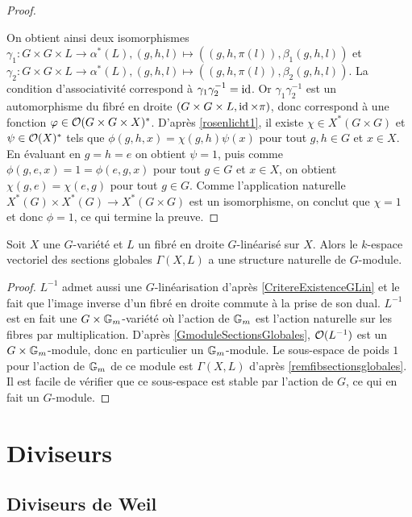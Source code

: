 \begin{proof}
\begin{center}
\begin{tikzcd}
	\end{tikzcd}
	\end{center}
	On obtient ainsi deux isomorphismes $\gamma_1:G\times G\times L\rightarrow\alpha^*(L), (g,h,l)\mapsto ((g,h,\pi(l)), \beta_1(g,h,l))$ et $\gamma_2:G\times G\times L\rightarrow\alpha^*(L), (g,h,l)\mapsto ((g,h,\pi(l)), \beta_2(g,h,l))$. La condition d'associativité correspond à $\gamma_1\gamma_2^{-1}=\id$. Or $\gamma_1\gamma_2^{-1}$ est un automorphisme du fibré en droite $(G\times G\times L,\id\times \pi)$, donc correspond à une fonction $\phi\in \Oo(G\times G\times X)^*$. D'après \ref{rosenlicht1}, il existe $\chi\in X^*(G\times G)$ et $\psi\in\Oo(X)^*$ tels que $\phi(g,h,x)=\chi(g,h)\psi(x)$ pour tout $g,h\in G$ et $x\in X$. En évaluant en $g=h=e$ on obtient $\psi=1$, puis comme $\phi(g,e,x)=1=\phi(e,g,x)$ pour tout $g\in G$ et $x\in X$, on obtient $\chi(g,e)=\chi(e,g)$ pour tout $g\in G$. Comme l'application naturelle $X^*(G)\times X^*(G)\rightarrow X^*(G\times G)$ est un isomorphisme, on conclut que $\chi=1$ et donc $\phi=1$, ce qui termine la preuve.
\end{proof}

\begin{prop}\label{GmoduleSectionsGlobalesGlin}
Soit $X$ une $G$-variété et $L$ un fibré en droite $G$-linéarisé sur $X$. Alors le $k$-espace vectoriel des sections globales $\Gamma(X, L)$ a une structure naturelle de $G$-module.
\end{prop}
\begin{proof}
$L^{-1}$ admet aussi une $G$-linéarisation d'après \ref{CritereExistenceGLin} et le fait que l'image inverse d'un fibré en droite commute à la prise de son dual. $L^{-1}$ est en fait une $G\times \GG_m$-variété où l'action de $\GG_m$ est l'action naturelle sur les fibres par multiplication. D'après \ref{GmoduleSectionsGlobales}, $\Oo(L^{-1})$ est un $G\times \GG_m$-module, donc en particulier un $\GG_m$-module. Le sous-espace de poids $1$ pour l'action de $\GG_m$ de ce module est $\Gamma(X, L)$ d'après \ref{remfibsectionsglobales}. Il est facile de vérifier que ce sous-espace est stable par l'action de $G$, ce qui en fait un $G$-module.
\end{proof}

\section{Diviseurs}

\subsection{Diviseurs de Weil}

